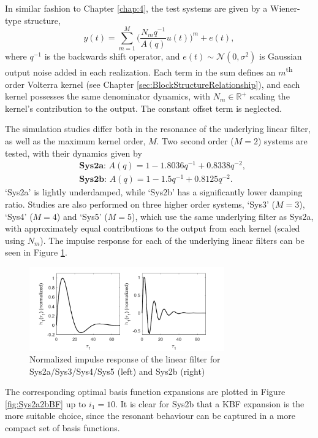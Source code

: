 In similar fashion to Chapter \ref{chap:4}, the test systems are given by a Wiener-type structure,
\begin{equation}
y(t) = \sum_{m=1}^M \bigg( \frac{N_m q^{-1}}{A(q)}u(t)\bigg)^m +e(t),
\end{equation}   
where $q^{-1}$ is the backwards shift operator, and $e(t) \sim \mathcal{N}(0,\sigma^2)$ is Gaussian output noise added in each realization. Each term in the sum defines an $m$\textsuperscript{th} order Volterra kernel (see Chapter \ref{sec:BlockStructureRelationship}), and each kernel possesses the same denominator dynamics, with $N_m \in \mathbb{R}^+$ scaling the kernel's contribution to the output. The constant offset term is neglected.

The simulation studies differ both in the resonance of the underlying linear filter, as well as the maximum kernel order, $M$. Two second order ($M=2$) systems are tested, with their dynamics given by
\begin{align*}
&\textbf{Sys2a: } A(q) = 1-1.8036q^{-1}+0.8338q^{-2}, \\ 
&\textbf{Sys2b: } A(q) = 1-1.5q^{-1}+0.8125q^{-2}.
\end{align*}
`Sys2a' is lightly underdamped, while `Sys2b' has a significantly lower damping ratio. Studies are also performed on three higher order systems, `Sys3' ($M=3$), `Sys4' ($M=4$) and `Sys5' ($M=5$), which use the same underlying filter as Sys2a, with approximately equal contributions to the output from each kernel (scaled using $N_m$). The impulse response for each of the underlying linear filters can be seen in Figure \ref{fig:Sys2a2bLinear}. 
\begin{figure}[!h]
\centering
\includegraphics[width = 0.75\textwidth]{Chapter5_RegBFs/Sys2a2b_h1.pdf}
\caption{Normalized impulse response of the linear filter for Sys2a/Sys3/Sys4/Sys5 (left) and Sys2b (right)}
\label{fig:Sys2a2bLinear}
\end{figure}
The corresponding optimal basis function expansions are plotted in Figure \ref{fig:Sys2a2bBF} up to $i_1 = 10$. It is clear for Sys2b that a KBF expansion is the more suitable choice, since the resonant behaviour can be captured in a more compact set of basis functions.

